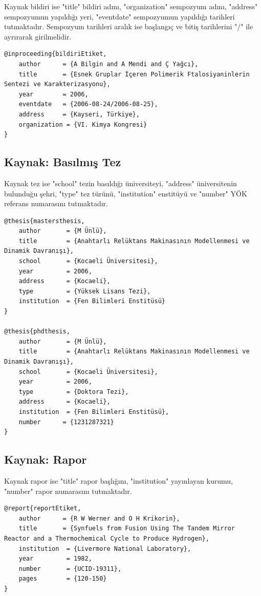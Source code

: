 Kaynak bildiri ise "title" bildiri adını, "organization" sempozyum adını, "address" sempozyumun yapıldığı yeri, "eventdate" sempozyumun yapıldığı tarihleri tutmaktadır. Sempozyum tarihleri aralık ise başlangıç ve bitiş tarihlerini "/" ile ayrırarak girilmelidir.

\begin{lstlisting}[language={[LaTeX]{TeX}}, label=bib:inproceeding, caption=Kaynak bildiri ise]
@inproceeding{bildiriEtiket,
	author 		= {A Bilgin and A Mendi and Ç Yağcı},
	title       = {Esnek Gruplar İçeren Polimerik Ftalosiyaninlerin Sentezi ve Karakterizasyonu},
	year		= 2006,
	eventdate   = {2006-08-24/2006-08-25},
	address     = {Kayseri, Türkiye},
	organization = {VI. Kimya Kongresi}
}
\end{lstlisting}


\subsection{Kaynak: Basılmış Tez}

Kaynak tez ise "school" tezin basıldığı üniversiteyi, "address" üniversitenin bulunduğu şehri, "type" tez türünü, "institution" enstitüyü ve "number" YÖK referans numarasını tutmaktadır.

\begin{lstlisting}[language={[LaTeX]{TeX}}, label=bib:thesis, caption=Kaynak basılmış tez ise]
@thesis{mastersthesis,
	author       = {M Ünlü}, 
	title        = {Anahtarlı Relüktans Makinasının Modellenmesi ve Dinamik	Davranışı},
	school       = {Kocaeli Üniversitesi},
	year         = 2006,
	address      = {Kocaeli},
	type		 = {Yüksek Lisans Tezi},
	institution  = {Fen Bilimleri Enstitüsü}
}

@thesis{phdthesis,
	author       = {M Ünlü}, 
	title        = {Anahtarlı Relüktans Makinasının Modellenmesi ve Dinamik	Davranışı},
	school       = {Kocaeli Üniversitesi},
	year         = 2006,
	type		 = {Doktora Tezi},
	address      = {Kocaeli},
	institution  = {Fen Bilimleri Enstitüsü},
	number		= {1231287321}
}
\end{lstlisting}


\subsection{Kaynak: Rapor}

Kaynak rapor ise "title" rapor başlığını, "institution" yayınlayan kurumu, "number" rapor numarasını tutmaktadır.

\begin{lstlisting}[language={[LaTeX]{TeX}}, label=bib:report, caption=Kaynak rapor ise]
@report{reportEtiket,
	author 		= {R W Werner and O H Krikorin},
	title 		= {Synfuels from Fusion Using The Tandem Mirror Reactor and a Thermochemical Cycle to Produce Hydrogen},
	institution  = {Livermore National Laboratory},
	year         = 1982,
	number       = {UCID-19311},
	pages		 = {120-150}
}
\end{lstlisting}

